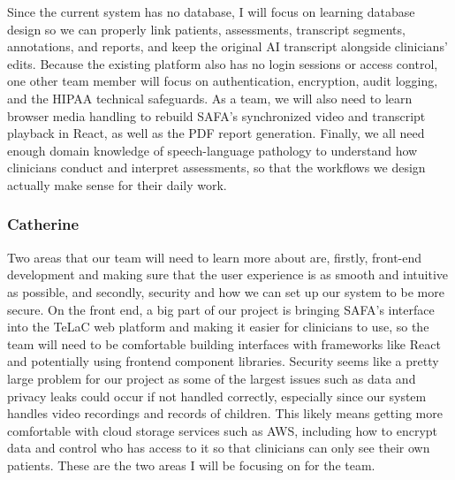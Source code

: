 \documentclass[12pt]{article}
\begin{document}
Since the current system has no database, I will focus on learning database design so we can properly link patients, assessments, transcript segments, annotations, and reports, and keep the original AI transcript alongside clinicians' edits. Because the existing platform also has no login sessions or access control, one other team member will focus on authentication, encryption, audit logging, and the HIPAA technical safeguards. As a team, we will also need to learn browser media handling to rebuild SAFA's synchronized video and transcript playback in React, as well as the PDF report generation. Finally, we all need enough domain knowledge of speech-language pathology to understand how clinicians conduct and interpret assessments, so that the workflows we design actually make sense for their daily work.

\subsubsection*{Catherine}
Two areas that our team will need to learn more about are, firstly, front-end development 
and making sure that the user experience is as smooth and intuitive as possible, and secondly, 
security and how we can set up our system to be more secure. 
On the front end, a big part of our project
is bringing SAFA's interface into the TeLaC web platform and making it easier for
clinicians to use, so the team will need to be comfortable building interfaces with
frameworks like React and potentially using frontend component libraries. 
Security seems like a pretty large problem for our project as some of the largest
issues such as data and privacy leaks could occur if not handled correctly, especially since our system handles video
recordings and records of children. This likely means getting more comfortable with
cloud storage services such as AWS, including how to encrypt data and control who has
access to it so that clinicians can only see their own patients. These are the two
areas I will be focusing on for the team.
\end{document}
